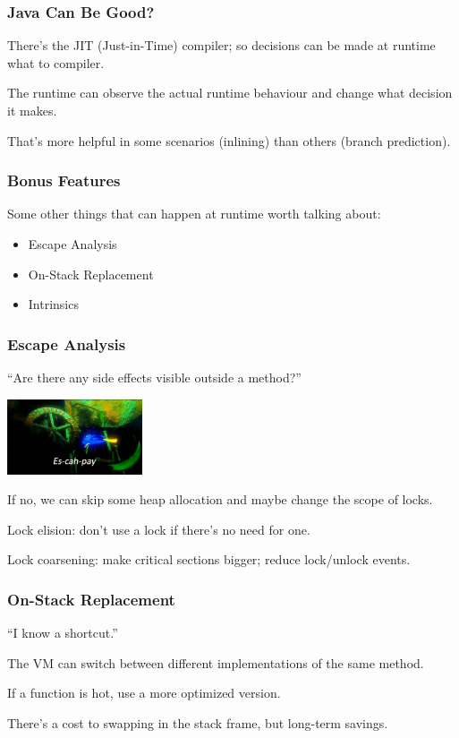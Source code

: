 \begin{frame}
\frametitle{Java Can Be Good?}

There's the JIT (Just-in-Time) compiler; so decisions can be made at runtime what to compiler.

The runtime can observe the actual runtime behaviour and change what decision it makes.

That's more helpful in some scenarios (inlining) than others (branch prediction).

\end{frame}

\begin{frame}
\frametitle{Bonus Features}
Some other things that can happen at runtime worth talking about:

\begin{itemize}
	\item Escape Analysis
	\item On-Stack Replacement
	\item Intrinsics
\end{itemize}

\end{frame}


\begin{frame}
\frametitle{Escape Analysis}

``Are there any side effects visible outside a method?''

\begin{center}
	\includegraphics[width=0.3\textwidth]{images/escape.png}
\end{center}

If no, we can skip some heap allocation and maybe change the scope of locks.

Lock elision: don't use a lock if there's no need for one.

Lock coarsening: make critical sections bigger; reduce lock/unlock events.

\end{frame}


\begin{frame}
\frametitle{On-Stack Replacement}

``I know a shortcut.''

The VM can switch between different implementations of the same method.

If a function is \alert{hot}, use a more optimized version.

There's a cost to swapping in the stack frame, but long-term savings.

\end{frame}

